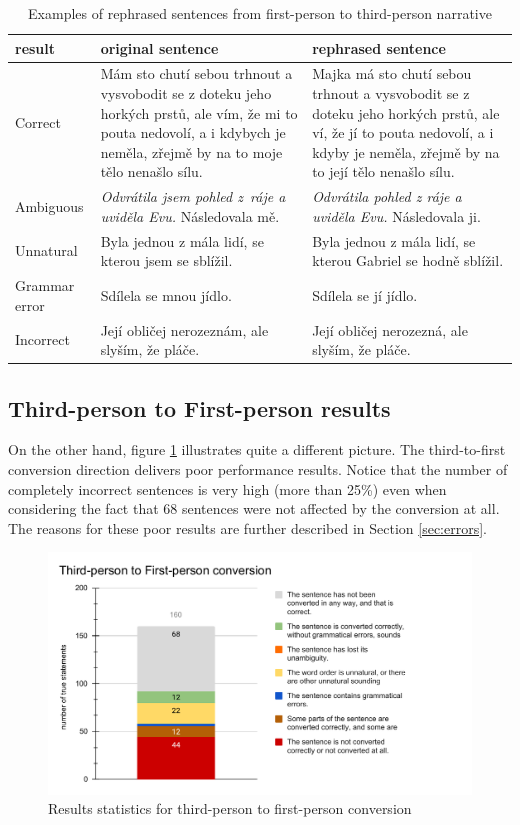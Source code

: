 \begin{table}[!ht]
	\caption{Examples of rephrased sentences from first-person to third-person narrative}
	\label{tab:example-first}
		\begin{tabular}{m{5em}|m{11em}|m{11em}}
			result & original sentence & rephrased sentence \\
			\hline
			Correct & Mám sto chutí sebou trhnout a vysvobodit se z doteku jeho horkých prstů, ale vím, že mi to pouta nedovolí, a i kdybych je neměla, zřejmě by na to moje tělo nenašlo sílu. &  Majka má sto chutí sebou trhnout a vysvobodit se z doteku jeho horkých prstů, ale ví, že jí to pouta nedovolí, a i kdyby je neměla, zřejmě by na to její tělo nenašlo sílu. \\
			Ambiguous & \emph{Odvrátila jsem pohled z~ráje a uviděla Evu.} Následovala mě. & \emph{Odvrátila pohled z ráje a uviděla Evu.} Následovala ji. \\
			Unnatural & Byla jednou z mála lidí, se kterou jsem se sblížil. & Byla jednou z mála lidí, se kterou Gabriel se hodně sblížil. \\
			Grammar error & Sdílela se mnou jídlo. & Sdílela se jí jídlo. \\
			Incorrect & Její obličej nerozeznám, ale slyším, že pláče. & Její obličej nerozezná, ale slyším, že pláče. \\
		\end{tabular}
\end{table}


\subsection{Third-person to First-person results}
On the other hand, figure \ref{fig:eval-third-to-first} illustrates quite a different picture. The third-to-first conversion direction delivers poor performance results. Notice that the number of completely incorrect sentences is very high (more than 25\%) even when considering the fact that 68 sentences were not affected by the conversion at all.
The reasons for these poor results are further described in Section \ref{sec:errors}.

\begin{figure}[!ht]
\includegraphics[width=\textwidth]{data/Eval-Third-To-First.pdf}
\caption{Results statistics for third-person to first-person conversion}
\label{fig:eval-third-to-first}
\end{figure}

